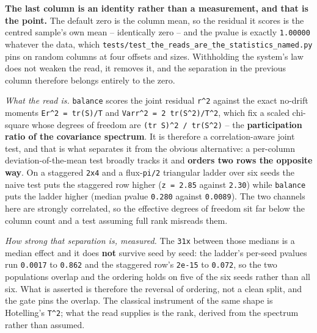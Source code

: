 \documentclass[10pt,letterpaper,twocolumn]{article}
\begin{document}
\textbf{The last column is an identity rather than a measurement, and that is the point.} The default
zero is the column mean, so the residual it scores is the centred sample's own mean -- identically
zero -- and the pvalue is exactly \texttt{1.\allowbreak{}00000} whatever the data, which
\texttt{tests/\allowbreak{}test\_\allowbreak{}the\_\allowbreak{}reads\_\allowbreak{}are\_\allowbreak{}the\_\allowbreak{}statistics\_\allowbreak{}named.\allowbreak{}py} pins on random columns at four offsets and
sizes. Withholding the system's law does not weaken the read, it
removes it, and the separation in the previous column therefore belongs entirely to the zero.

\emph{What the read is.} \texttt{balance} scores the joint residual \texttt{\textbar{}\allowbreak{}\textbar{}\allowbreak{}r\textbar{}\allowbreak{}\textbar{}\allowbreak{}\^{}2} against the
exact no-drift moments \texttt{E\textbar{}\allowbreak{}\textbar{}\allowbreak{}r\textbar{}\allowbreak{}\textbar{}\allowbreak{}\^{}2\ =\allowbreak{}\ tr(\allowbreak{}S)\allowbreak{}/\allowbreak{}T} and \texttt{Var\textbar{}\allowbreak{}\textbar{}\allowbreak{}r\textbar{}\allowbreak{}\textbar{}\allowbreak{}\^{}2\ =\allowbreak{}\ 2\ tr(\allowbreak{}S\^{}2)\allowbreak{}/\allowbreak{}T\^{}2}, which fix a scaled
chi-square whose degrees of freedom are \texttt{(\allowbreak{}tr\ S)\allowbreak{}\^{}2\ /\allowbreak{}\ tr(\allowbreak{}S\^{}2)\allowbreak{}} -- the \textbf{participation ratio of the
covariance spectrum}. It is therefore a correlation-aware joint test, and that is what separates
it from the obvious alternative: a per-column deviation-of-the-mean test broadly tracks it and
\textbf{orders two rows the opposite way}. On a staggered \texttt{2x4} and a flux-\texttt{pi/\allowbreak{}2} triangular ladder over
six seeds the naive test puts the staggered row higher (\texttt{z\ =\allowbreak{}\ 2.\allowbreak{}85} against \texttt{2.\allowbreak{}30}) while \texttt{balance}
puts the ladder higher (median pvalue \texttt{0.\allowbreak{}280} against \texttt{0.\allowbreak{}0089}). The two channels here are strongly
correlated, so the effective degrees of freedom sit far below the column count and a test assuming
full rank misreads them.

\emph{How strong that separation is, measured.} The \texttt{31x} between those medians is a median effect and
it does \textbf{not} survive seed by seed: the ladder's per-seed pvalues run \texttt{0.\allowbreak{}0017} to \texttt{0.\allowbreak{}862} and the
staggered row's \texttt{2e-{}\allowbreak{}15} to \texttt{0.\allowbreak{}072}, so the two populations overlap and the ordering holds on five of
the six seeds rather than all six. What is asserted is therefore the reversal of ordering, not a
clean split, and the gate pins the overlap. The classical instrument of the same shape is
Hotelling's \texttt{T\^{}2}; what the read supplies is the rank, derived from the spectrum rather than
assumed.
\end{document}
